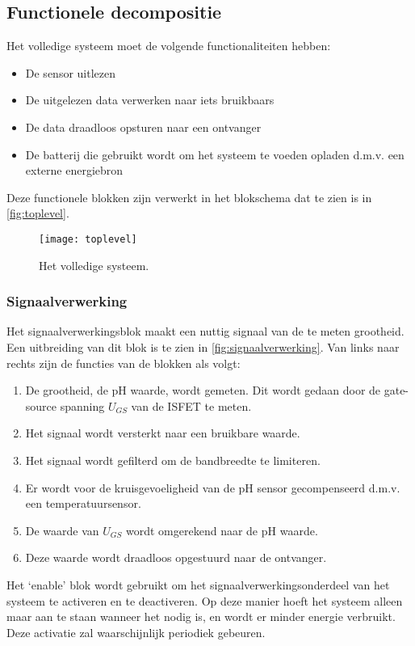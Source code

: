 \subsection{Functionele decompositie}
Het volledige systeem moet de volgende functionaliteiten hebben:

\begin{itemize}
    \item De sensor uitlezen
    \item De uitgelezen data verwerken naar iets bruikbaars
    \item De data draadloos opsturen naar een ontvanger
    \item De batterij die gebruikt wordt om het systeem te voeden opladen d.m.v. een externe energiebron
\end{itemize}
Deze functionele blokken zijn verwerkt in het blokschema dat te zien is in \autoref{fig:toplevel}.

\begin{figure}[ht]
    \centering
    \texttt{[image: toplevel]}
    \caption{Het volledige systeem.}
    \label{fig:toplevel}
\end{figure}

\subsubsection{Signaalverwerking}
Het signaalverwerkingsblok maakt een nuttig signaal van de te meten grootheid. Een uitbreiding van dit blok is te zien in \autoref{fig:signaalverwerking}.
Van links naar rechts zijn de functies van de blokken als volgt:
\begin{enumerate}
    \item De grootheid, de pH waarde, wordt gemeten. Dit wordt gedaan door de gate-source spanning $U_{GS}$ van de ISFET te meten.
    \item Het signaal wordt versterkt naar een bruikbare waarde.
    \item Het signaal wordt gefilterd om de bandbreedte te limiteren.
    \item Er wordt voor de kruisgevoeligheid van de pH sensor gecompenseerd d.m.v. een temperatuursensor.
    \item De waarde van $U_{GS}$ wordt omgerekend naar de pH waarde.
    \item Deze waarde wordt draadloos opgestuurd naar de ontvanger.
\end{enumerate}
Het `enable' blok wordt gebruikt om het signaalverwerkingsonderdeel van het systeem te activeren en te deactiveren. Op deze manier hoeft het systeem alleen maar aan te staan wanneer het nodig is, en wordt er minder energie verbruikt. Deze activatie zal waarschijnlijk periodiek gebeuren.

